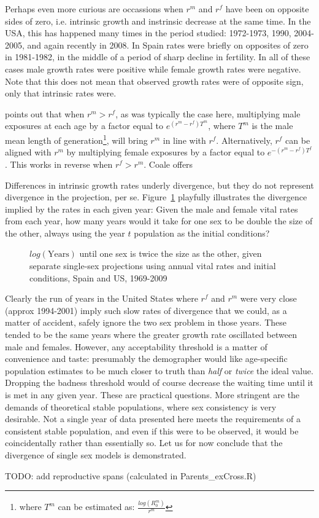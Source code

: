 Perhaps even more curious are occassions when $r^m$ and $r^f$ have been on
opposite sides of zero, i.e. intrinsic growth and instrinsic decrease at the
same time. In the USA, this has happened many times in the period studied:
1972-1973, 1990, 2004-2005, and again recently in 2008. In Spain rates were 
briefly on opposites of zero in 1981-1982, in the middle of a period of sharp
decline in fertility. In all of these cases male growth rates were positive
while female growth rates were negative. Note that this does not mean that 
observed growth rates were of opposite sign, only that intrinsic
rates were. 

\citet[p. 57]{coale1972growth} points out that when $r^m > r^f$, as was
typically the case here, multiplying male exposures at each age by a factor equal to
$e^{(r^m - r^f)T^m}$, where $T^m$ is the male mean length of
generation\footnote{where $T^m$ can be estimated as:
$\frac{log(R_0^m)}{r^m}$}, will bring $r^m$ in line with $r^f$. Alternatively,
$r^f$ can be aligned with $r^m$ by multiplying female exposures by a factor equal
 to $e^{-(r^m - r^f)T^f}$. This works in reverse when $r^f > r^m$. Coale offers 

Differences in intrinsic growth rates underly divergence, but they
do not represent divergence in the projection, per se.
Figure~\ref{fig:rSRdoubling} playfully illustrates the divergence implied by the 
rates in each given year: Given the
male and female vital rates from each year, how many years would it take for one
sex to be double the size of the other, always using the year $t$ population as
the initial conditions?

\begin{figure}[ht!]
        \centering  
          \caption{$log(\mathrm{Years})$ until one sex is twice the size as the
          other, given separate single-sex projections using annual vital rates and initial
          conditions, Spain and US, 1969-2009}
           \quad
          \label{fig:rSRdoubling}
\end{figure}

Clearly the run of years in the United States where $r^f$ and $r^m$ were very
close (approx 1994-2001) imply such slow rates of divergence that we could, as a
matter of accident, safely ignore the two sex problem in those years. These
tended to be the same years where the greater growth rate oscillated between
male and females. However, any acceptability threshold is a matter of
convenience and taste: presumably the demographer would like age-specific 
population estimates to be much closer to truth than \textit{half} or \textit{twice} the ideal value.
Dropping the badness threshold would of course decrease the waiting time until
it is met in any given year. These are practical questions. More
stringent are the demands of theoretical stable populations, where
sex consistency is very desirable. Not a single year of data presented here
meets the requirements of a consistent stable population, and even if this were
to be observed, it would be coincidentally rather than essentially so. Let us
for now conclude that the divergence of single sex models is demonstrated.

TODO: add reproductive spans (calculated in Parents\_exCross.R)









